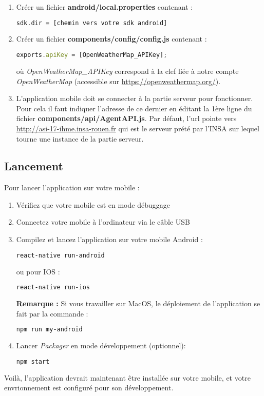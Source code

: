 \begin{enumerate}
  \item Créer un fichier \textbf{android/local.properties} contenant :
  \begin{lstlisting}[language=bash]
  sdk.dir = [chemin vers votre sdk android]
  \end{lstlisting}
  \item Créer un fichier \textbf{components/config/config.js} contenant :
  \begin{lstlisting}[language=Javascript]
  exports.apiKey = [OpenWeatherMap_APIKey];
  \end{lstlisting}

  où \og \emph{OpenWeatherMap\_APIKey} \fg{} correspond à la clef liée à notre compte \emph{OpenWeatherMap} (accessible sur \url{https://openweathermap.org/}).

  \item L'application mobile doit se connecter à la partie serveur pour fonctionner. Pour cela il faut indiquer l'adresse de ce dernier en
  éditant la 1ère ligne du fichier \textbf{components/api/AgentAPI.js}. Par défaut, l'url pointe vers \url{http://asi-17-ihme.insa-rouen.fr} qui est le serveur prété par l'INSA sur lequel tourne une instance de la partie serveur.
\end{enumerate}

\subsection{Lancement}

Pour lancer l'application sur votre mobile :
\begin{enumerate}
  \item Vérifiez que votre mobile est en mode débuggage
  \item Connectez votre mobile à l'ordinateur via le câble USB
  \item Compilez et lancez l'application sur votre mobile Android :
  \begin{lstlisting}[language=bash]
    react-native run-android
  \end{lstlisting}
  ou pour IOS :
  \begin{lstlisting}[language=bash]
    react-native run-ios
  \end{lstlisting}

  \textbf{Remarque : } Si vous travailler sur MacOS, le déploiement de l'application se fait par la commande :
  \begin{lstlisting}[language=bash]
    npm run my-android
  \end{lstlisting}

  \item Lancer \emph{Packager} en mode développement (optionnel):
  \begin{lstlisting}[language=bash]
    npm start
  \end{lstlisting}
\end{enumerate}

Voilà, l'application devrait maintenant être installée sur votre mobile, et votre envrionnement est configuré pour son développement.
